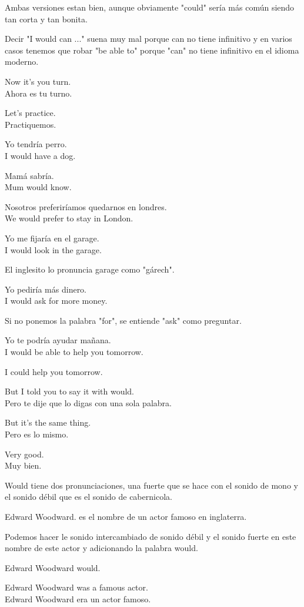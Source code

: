 Ambas versiones estan bien, aunque obviamente "could" sería más común siendo
tan corta y tan bonita.

Decir "I would can ..." suena muy mal porque can no tiene infinitivo
y en varios casos tenemos que robar "be able to" porque "can" no tiene
infinitivo en el idioma moderno.

Now it's you turn.\\
Ahora es tu turno.

Let's practice.\\
Practiquemos.

Yo tendría perro.\\
I would have a dog.

Mamá sabría.\\
Mum would know.

Nosotros preferiríamos quedarnos en londres.\\
We would prefer to stay in London.

Yo me fijaría en el garage.\\
I would look in the garage.

El inglesito lo pronuncia garage como "gárech".

Yo pediría más dinero.\\
I would ask for more money.

Si no ponemos la palabra "for", se entiende "ask" como preguntar.

Yo te podría ayudar mañana.\\
I would be able to help you tomorrow.

I could help you tomorrow.

But I told you to say it with would.\\
Pero te dije que lo digas con una sola palabra.

But it's the same thing.\\
Pero es lo mismo.

Very good.\\
Muy bien.

Would tiene dos pronunciaciones, una fuerte que se hace con el sonido de
mono y el sonido débil que es el sonido de cabernicola.

Edward Woodward. es el nombre de un actor famoso en inglaterra.

Podemos hacer le sonido intercambiado de sonido débil y el sonido fuerte
en este nombre de este actor y adicionando la palabra would.

Edward Woodward would.

Edward Woodward was a famous actor.\\
Edward Woodward era un actor famoso.



